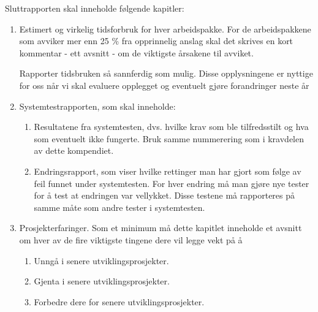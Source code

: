Sluttrapporten skal inneholde følgende kapitler:

\begin{enumerate}

\item
Estimert og virkelig tidsforbruk for hver arbeidspakke. For de arbeidspakkene som avviker mer enn 25 \% fra opprinnelig anslag skal det skrives en kort kommentar - ett avsnitt - om de viktigste årsakene til avviket.

Rapporter tidsbruken så sannferdig som mulig. Disse opplysningene er nyttige for oss når vi skal evaluere opplegget og eventuelt gjøre forandringer neste år

\item
Systemtestrapporten, som skal inneholde:

\begin{enumerate}

\item
Resultatene fra systemtesten, dvs. hvilke krav som ble tilfredsstilt og hva som eventuelt ikke fungerte. Bruk samme nummerering som i kravdelen av dette kompendiet.

\item
Endringsrapport, som viser hvilke rettinger man har gjort som følge av feil funnet under systemtesten. For hver endring må man gjøre nye tester for å test at endringen var vellykket. Disse testene må rapporteres på samme måte som andre tester i systemtesten.

\end{enumerate}

\item
Prosjekterfaringer. Som et minimum må dette kapitlet inneholde et avsnitt om hver av de fire viktigste tingene dere vil legge vekt på å 

\begin{enumerate}

\item
Unngå i senere utviklingsprosjekter.

\item
Gjenta i senere utviklingsprosjekter.

\item
Forbedre dere for senere utviklingsprosjekter.

\end{enumerate}

\end{enumerate}
